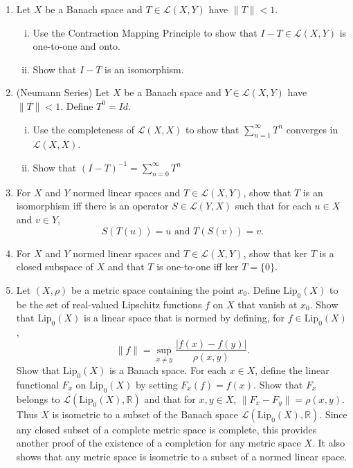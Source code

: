 \begin{enumerate}
    \ \\
    \item Let $X$ be a Banach space and $T\in\mathcal{L}(X,Y)$ have $\|T\|<1$.
    \begin{enumerate}[(i)]
        \item Use the Contraction Mapping Principle to show that $I-T\in\mathcal{L}(X,Y)$ is one-to-one and onto.
        \item Show that $I-T$ is an isomorphism.
    \end{enumerate}
    \item (Neumann Series) Let $X$ be a Banach space and $Y\in\mathcal{L}(X,Y)$ have $\|T\|<1$.
    Define $T^0=Id$.
    \begin{enumerate}[(i)]
        \item Use the completeness of $\mathcal{L}(X,X)$ to show that $\sum_{n=1}^\infty T^n$ converges in $\mathcal{L}(X,X)$.
        \item Show that $(I-T)^{-1}=\sum_{n=0}^\infty T^n$
    \end{enumerate}
    \item For $X$ and $Y$ normed linear spaces and $T\in\mathcal{L}(X,Y)$, show that $T$ is an isomorphism iff there is an operator $S\in\mathcal{L}(Y,X)$ such that for each $u\in X$ and $v\in Y$,
    \[
        S(T(u))=u\text{ and }T(S(v))=v.
    \]
    \item For $X$ and $Y$ normed linear spaces and $T\in\mathcal{L}(X,Y)$, show that $\text{ker }T$ is a closed subspace of $X$ and that $T$ is one-to-one iff $\text{ker }T=\{0\}$.
    \item Let $(X,\rho)$ be a metric space containing the point $x_0$.
    Define $\text{Lip}_0(X)$ to be the set of real-valued Lipschitz functions $f$ on $X$ that vanish at $x_0$.
    Show that $\text{Lip}_0(X)$ is a linear space that is normed by defining, for $f\in\text{Lip}_0(X)$,
    \[
        \|f\|=\sup_{x\neq y}\frac{|f(x)-f(y)|}{\rho(x,y)}.
    \]
    Show that $\text{Lip}_0(X)$ is a Banach space.
    For each $x\in X$, define the linear functional $F_x$ on $\text{Lip}_0(X)$ by setting $F_x(f)=f(x)$.
    Show that $F_x$ belongs to $\mathcal{L}(\text{Lip}_0(X),\mathbb{R})$ and that for $x,y\in X$, $\|F_x-F_y\|=\rho(x,y)$.
    Thus $X$ is isometric to a subset of the Banach space $\mathcal{L}(\text{Lip}_0(X),\mathbb{R})$.
    Since any closed subset of a complete metric space is complete, this provides another proof of the existence of a completion for any metric space $X$.
    It also shows that any metric space is isometric to a subset of a normed linear space.

\end{enumerate}
